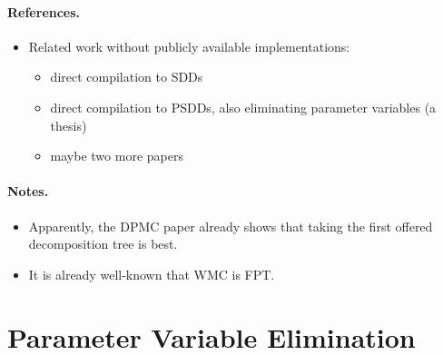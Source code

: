 \documentclass{article}
\theoremstyle{definition}
\theoremstyle{remark}
\begin{document}
\paragraph{References.}
\begin{itemize}
\item Related work without publicly available implementations:
  \begin{itemize}
  \item direct compilation to SDDs \cite{DBLP:conf/ecsqaru/ChoiKD13}
  \item direct compilation to PSDDs, also eliminating parameter variables (a thesis)
  \item maybe two more papers
  \end{itemize}
\end{itemize}

\paragraph{Notes.}
\begin{itemize}
\item Apparently, the DPMC paper already shows that taking the first offered
  decomposition tree is best.
\item It is already well-known that WMC is FPT.
\end{itemize}

\section{Parameter Variable Elimination}
\end{document}
